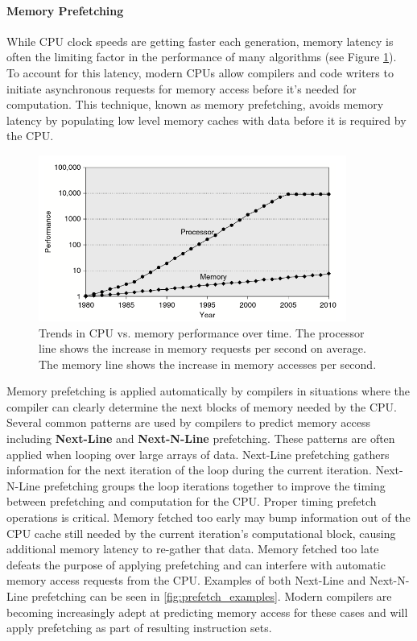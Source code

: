 \paragraph{Memory Prefetching}

While CPU clock speeds are getting faster each generation, memory latency is
often the limiting factor in the performance of many algorithms (see Figure
\ref{fig:memory_latency}). To account for this latency, modern CPUs allow
compilers and code writers to initiate asynchronous requests for memory access
before it's needed for computation. This technique, known as memory prefetching, avoids memory
latency by populating low level memory caches with data before it is required by
the CPU.

\begin{figure}[H]
\centering
\includegraphics[width=0.9\textwidth]{../images/mem_latency.png}
\caption[Memory latency comparison over time.]{Trends in CPU vs. memory
  performance over time. The processor line shows the increase in memory
  requests per second on average. The memory line shows the increase in memory
  accesses per second. \cite{Hennessy_2012}}
\label{fig:memory_latency}
\end{figure}

Memory prefetching is applied automatically by compilers in situations where the
compiler can clearly determine the next blocks of memory needed by the
CPU. Several common patterns are used by compilers to predict memory access
including \textbf{Next-Line} and \textbf{Next-N-Line} prefetching. These
patterns are often applied when looping over large arrays of data. Next-Line
prefetching gathers information for the next iteration of the loop during the
current iteration. Next-N-Line prefetching groups the loop iterations together
to improve the timing between prefetching and computation for the CPU. Proper timing
prefetch operations is critical. Memory fetched too early may bump information
out of the CPU cache still needed by the current iteration's computational
block, causing additional memory latency to re-gather that data. Memory fetched
too late defeats the purpose of applying prefetching and can interfere with
automatic memory access requests from the CPU. Examples of both Next-Line and
Next-N-Line prefetching can be seen in \ref{fig:prefetch_examples}. Modern
compilers are becoming increasingly adept at predicting memory access for these
cases and will apply prefetching as part of resulting instruction sets.

